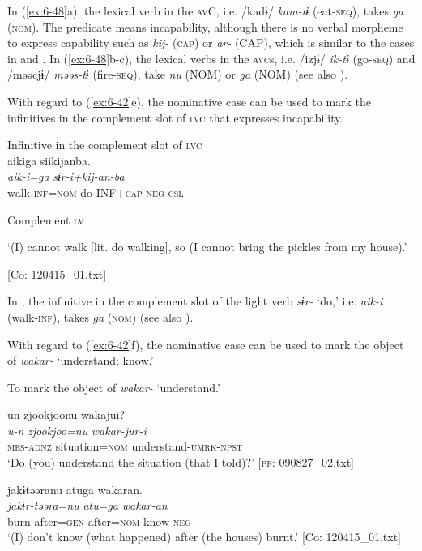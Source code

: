 \begin{table}
In (\ref{ex:6-48}a), the lexical verb in the \textsc{av}C, i.e. /kadɨ/ \textit{kam-tɨ} (eat-\textsc{seq}), takes \textit{ga} (\textsc{nom}). The predicate means incapability, although there is no verbal morpheme to express capability such as \textit{kij-} (\textsc{cap}) or \textit{ar-} (CAP), which is similar to the cases in  and . In (\ref{ex:6-48}b-c), the lexical verbs in the \textsc{avc}s, i.e. /izjɨ/ \textit{ik-tɨ} (go-\textsc{seq}) and /məəcjɨ/ \textit{məəs-tɨ} (fire-\textsc{seq}), take \textit{nu} (NOM) or \textit{ga} (NOM) (see also ).

With regard to (\ref{ex:6-42}e), the nominative case can be used to mark the infinitives in the complement slot of \textsc{lvc} that expresses incapability.

\ea\label{ex:6-49}
 Infinitive in the complement slot of \textsc{lvc}\\

{\TM}
\glll aikiga  siikijanba.\\
\textit{aik-i=ga}  \textit{sɨr-i+kij-an-ba}\\

    walk-\textsc{inf}=\textsc{nom}  do-INF+\textsc{cap}-\textsc{neg}-\textsc{csl}

    Complement  \textsc{lv}

\glt    ‘(I) cannot walk [lit. do walking], so (I cannot bring the pickles from my house).’

  [Co: 120415\_01.txt]
\z

In , the infinitive in the complement slot of the light verb \textit{sɨr-} ‘do,’ i.e. \textit{aik-i} (walk-\textsc{inf}), takes \textit{ga} (\textsc{nom}) (see also ).

  With regard to (\ref{ex:6-42}f), the nominative case can be used to mark the object of \textit{wakar-} ‘understand; know.’

\ea\label{ex:6-50}
  To mark the object of \textit{wakar-} ‘understand.’

 \ea {\TM}  un  {\textbar}zjookjoo{\textbar}nu  wakajui?\\
\glll \textit{u-n}  \textit{zjookjoo=nu}  \textit{wakar-jur-i}\\
\textsc{mes}-\textsc{adnz}  situation=\textsc{nom}  understand-\textsc{umrk}-\textsc{npst}\\
\glt ‘Do (you) understand the situation (that I told)?’ [\textsc{pf}: 090827\_02.txt]
\z

\ex {\TM}  jakɨtəəranu  atuga  wakaran.\\
\glll \textit{jakɨr-təəra=nu}  \textit{atu=ga}  \textit{wakar-an}\\
burn-after=\textsc{gen}  after=\textsc{nom}  know-\textsc{neg}\\
\glt ‘(I) don’t know (what happened) after (the houses) burnt.’ [Co: 120415\_01.txt]
\z


\end{table}
